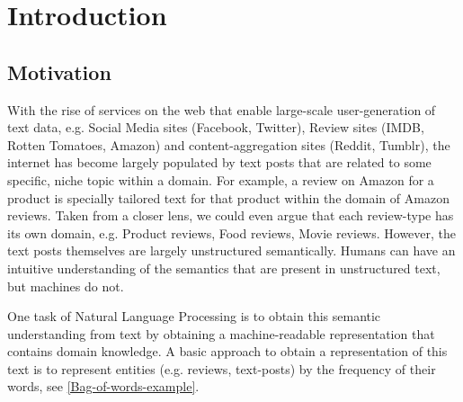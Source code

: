 \chapter{Introduction}




\section{Motivation}

With the rise of services on the web that enable large-scale user-generation of text data, e.g. Social Media sites (Facebook, Twitter), Review sites (IMDB, Rotten Tomatoes, Amazon) and content-aggregation sites (Reddit, Tumblr), the internet has become largely populated by text posts that are related to some specific, niche topic within a domain. For example, a review on Amazon for a product is specially tailored text for that product within the domain of Amazon reviews. Taken from a closer lens, we could even argue that each review-type has its own domain, e.g. Product reviews, Food reviews, Movie reviews. However, the text posts themselves are largely unstructured semantically. Humans can have an intuitive understanding of the semantics that are present in unstructured text, but machines do not. 

One task of Natural Language Processing is to obtain this semantic understanding from text by obtaining a machine-readable representation that contains domain knowledge. A basic approach to obtain a representation of this text is to represent entities (e.g. reviews, text-posts) by the frequency of their words, see \ref{Bag-of-words-example}.

